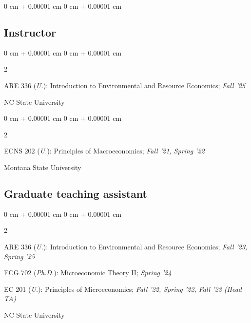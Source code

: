 \documentclass[12pt]{article}
\newenvironment{onecolentry}{
	\begin{adjustwidth}{
			0 cm + 0.00001 cm
		}{
			0 cm + 0.00001 cm
		}
	}
	{
	\end{adjustwidth}
} %
\newenvironment{paper}{
	\begin{onecolentry}
	\begin{hangingpar}
}{
	\end{hangingpar}
	\end{onecolentry}
	\smallskip
} %
\newenvironment{twocolentry}[2][]{
	\onecolentry
	\def\secondColumn{#2}
	\setcolumnwidth{\fill, 4.5 cm}
	\begin{paracol}{2}
	}{
		\switchcolumn \raggedleft \secondColumn
	\end{paracol}
	\endonecolentry
} %
\begin{document}
\begin{paper}
\subsection{Instructor}

\vspace{0.1cm}

\begin{twocolentry}{NC State University}
	\begin{hangingpar}
		ARE 336 (\textit{U.}): Introduction to Environmental and Resource Economics; \textit{Fall '25}
	\end{hangingpar}
\end{twocolentry}
\begin{twocolentry}{Montana State University}
	\begin{hangingpar}
		ECNS 202 (\textit{U.}): Principles of Macroeconomics; \textit{Fall '21, Spring '22}
	\end{hangingpar}
\end{twocolentry}

\subsection{Graduate teaching assistant}

\vspace{0.1cm}

\begin{twocolentry}{NC State University}
	\begin{hangingpar}
		ARE 336 (\textit{U.}): Introduction to Environmental and Resource Economics; \textit{Fall '23, Spring '25}
	\end{hangingpar}
	\begin{hangingpar}
		ECG 702 (\textit{Ph.D.}): Microeconomic Theory II; \textit{Spring '24}
	\end{hangingpar}
	\begin{hangingpar}
		EC 201 (\textit{U.}): Principles of Microeconomics; \textit{Fall '22, Spring '22, Fall '23 (Head TA)}
	\end{hangingpar}
\end{twocolentry}


\end{paper}
\end{document}

